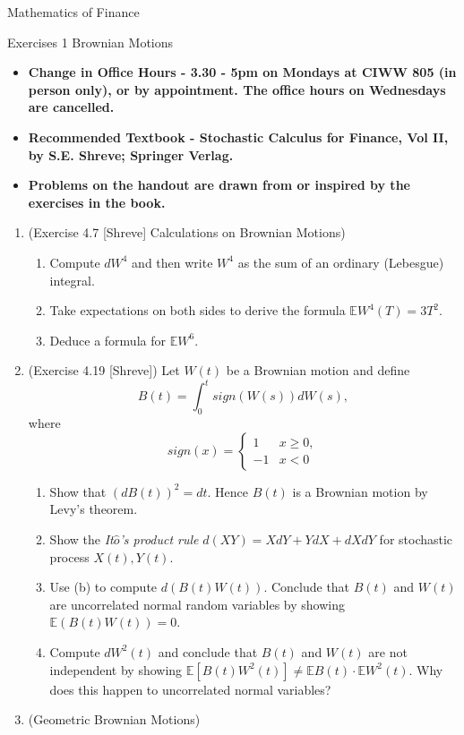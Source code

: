 \documentclass{article}
\begin{document}
{\bf \centerline{\Large Mathematics of Finance }}
\vskip0.25cm
{\bf \centerline{\Large Exercises 1 \quad Brownian Motions}}
\vskip0.25cm

\begin{itemize}
\item {\bf Change in Office Hours - 3.30 - 5pm on Mondays at CIWW 805 (in person only), or by appointment. The office hours on Wednesdays are cancelled.}
\item {\bf Recommended Textbook - Stochastic Calculus for Finance, Vol II, by S.E. Shreve; Springer Verlag. }
\item {\bf Problems on the handout are drawn from or inspired by the exercises in the book.} 
\end{itemize}

\begin{enumerate}
\item (Exercise 4.7 [Shreve] Calculations on Brownian Motions)
\begin{enumerate}
\item Compute $dW^4$ and then write $W^4$ as the sum of an ordinary (Lebesgue) integral.
\item Take expectations on both sides to derive the formula $\mathbb EW^4(T)=3T^2$.
\item Deduce a formula for $\mathbb EW^6$.
\end{enumerate}
\item (Exercise 4.19 [Shreve]) Let $W(t)$ be a Brownian motion and define
\[
B(t)=\int_0^t sign(W(s))dW(s),
\]
where 
\[
sign(x)=\begin{cases} 1 & x\geq0, \\ -1 & x<0 \end{cases}
\]
\begin{enumerate}
\item Show that $(dB(t))^2=dt$. Hence $B(t)$ is a Brownian motion by Levy's theorem.
\item Show the \emph{It$\hat o$'s product rule} $d(XY)=XdY+YdX+dXdY$ for stochastic process $X(t), Y(t)$. 
\item Use (b) to compute $d(B(t)W(t))$. Conclude that $B(t)$ and $W(t)$ are uncorrelated normal random variables by showing $\mathbb E(B(t)W(t))=0$. 
\item Compute $dW^2(t)$ and conclude that $B(t)$ and $W(t)$ are not independent by showing $\mathbb E[B(t)W^2(t)] \neq \mathbb EB(t)\cdot \mathbb EW^2(t)$. Why does this happen to uncorrelated normal variables?
\end{enumerate}
\item (Geometric Brownian Motions)

\end{enumerate}
\end{document}
